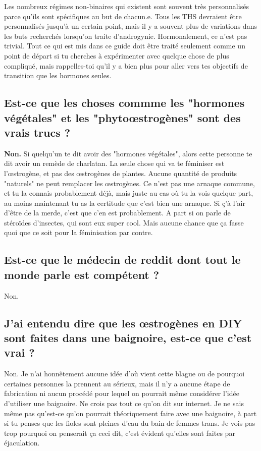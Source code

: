 \documentclass{article}
\begin{document}
Les nombreux régimes non-binaires qui existent sont souvent très personnalisés parce qu'ils sont spécifiques au but de chacun.e. Tous les THS devraient être personnalisés jusqu'à un certain point, mais il y a souvent plus de variations dans les buts recherchés lorsqu'on traite d'androgynie. Hormonalement, ce n'est pas trivial. Tout ce qui est mis dans ce guide doit être traité seulement comme un point de départ si tu cherches à expérimenter avec quelque chose de plus compliqué, mais rappelles-toi qu'il y a bien plus pour aller vers tes objectifs de transition que les hormones seules.

\subsection{Est-ce que les choses commme les "hormones végétales" et les "phytoœstrogènes" sont des vrais trucs ?}

\textbf{Non.} Si quelqu'un te dit avoir des "hormones végétales", alors cette personne te dit avoir un remède de charlatan. La seule chose qui va te féminiser est l'œstrogène, et pas des œstrogènes de plantes. Aucune quantité de produits "naturels" ne peut remplacer les œstrogènes. Ce n'est pas une arnaque commune, et tu la connais probablement déjà, mais juste au cas où tu la vois quelque part, au moins maintenant tu as la certitude que c'est bien une arnaque. Si ç'à l'air d'être de la merde, c'est que c'en est probablement. A part si on parle de stéroïdes d'insectes, qui sont eux super cool. Mais aucune chance que ça fasse quoi que ce soit pour la féminisation par contre.

\subsection{Est-ce que le médecin de reddit dont tout le monde parle est compétent ?}

Non.

\subsection{J'ai entendu dire que les œstrogènes en DIY sont faites dans une baignoire, est-ce que c'est vrai ?}

Non. Je n'ai honnêtement aucune idée d'où vient cette blague ou de pourquoi certaines personnes la prennent au sérieux, mais il n'y a aucune étape de fabrication ni aucun procédé pour lequel on pourrait même considérer l'idée d'utiliser une baignoire. Ne crois pas tout ce qu'on dit sur internet. Je ne sais même pas qu'est-ce qu'on pourrait théoriquement faire avec une baignoire, à part si tu penses que les fioles sont pleines d'eau du bain de femmes trans. Je vois pas trop pourquoi on penserait ça ceci dit, c'est évident qu'elles sont faites par éjaculation.
\end{document}
